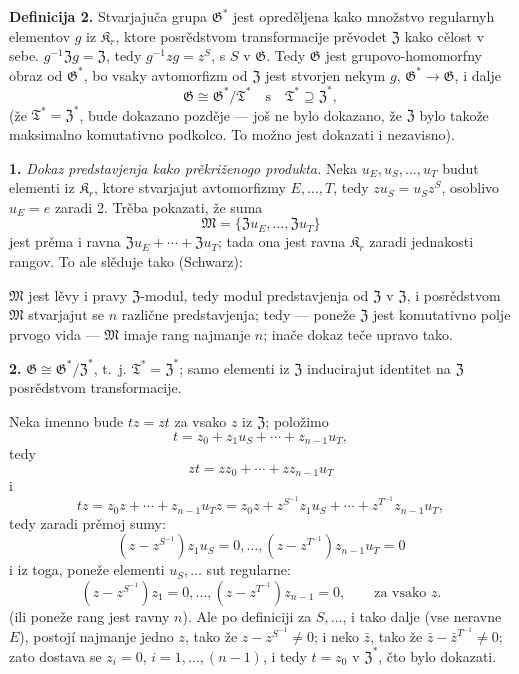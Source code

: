 \documentclass[11pt]{article}
\begin{document}
\noindent\textbf{Definicija 2.} Stvarjajuča grupa \(\mathfrak G^*\) jest opreděljena kako množstvo regularnyh elementov \(g\) iz \(\mathfrak K_r\), ktore posrědstvom transformacije prěvodet \(\mathfrak Z\) kako cělost v sebe. \(g^{-1}\mathfrak Zg=\mathfrak Z\), tedy \(g^{-1}zg=z^S\), s \(S\) v \(\mathfrak G\). Tedy \(\mathfrak G\) jest grupovo-homomorfny obraz od \(\mathfrak G^*\), bo vsaky avtomorfizm od \(\mathfrak Z\) jest stvorjen nekym \(g\), \(\mathfrak G^*\to\mathfrak G\), i dalje
\[
\mathfrak G\cong\mathfrak G^*/\mathfrak T^*
\quad\text{s}\quad
\mathfrak T^*\supseteq\mathfrak Z^*,
\]
(že \(\mathfrak T^*=\mathfrak Z^*\), bude dokazano pozděje --- još ne bylo dokazano, že \(\mathfrak Z\) bylo takože maksimalno komutativno podkolco. To možno jest dokazati i nezavisno).

\noindent\textbf{1.} \emph{Dokaz predstavjenja kako prěkriženogo produkta.} Neka \(u_E,u_S,\ldots,u_T\) budut elementi iz \(\mathfrak K_r\), ktore stvarjajut avtomorfizmy \(E,\ldots,T\), tedy \(zu_S=u_Sz^S\), osoblivo \(u_E=e\) zaradi 2. Trěba pokazati, že suma
\[
\mathfrak M=\{\mathfrak Zu_E,\ldots,\mathfrak Zu_T\}
\]
jest prěma i ravna \(\mathfrak Zu_E+\cdots+\mathfrak Zu_T\); tada ona jest ravna \(\mathfrak K_r\) zaradi jednakosti rangov. To ale slěduje tako (Schwarz):

\(\mathfrak M\) jest lěvy i pravy \(\mathfrak Z\)-modul, tedy modul predstavjenja od \(\mathfrak Z\) v \(\mathfrak Z\), i posrědstvom \(\mathfrak M\) stvarjajut se \(n\) različne predstavjenja; tedy --- poneže \(\mathfrak Z\) jest komutativno polje prvogo vida --- \(\mathfrak M\) imaje rang najmanje \(n\); inače dokaz teče upravo tako.

\noindent\textbf{2.} \(\mathfrak G\cong\mathfrak G^*/\mathfrak Z^*\), t.~j. \(\mathfrak T^*=\mathfrak Z^*\); samo elementi iz \(\mathfrak Z\) inducirajut identitet na \(\mathfrak Z\) posrědstvom transformacije.

Neka imenno bude \(tz=zt\) za vsako \(z\) iz \(\mathfrak Z\); položimo
\[
t=z_0+z_1u_S+\cdots+z_{n-1}u_T,
\]
tedy
\[
zt=zz_0+\cdots+zz_{n-1}u_T
\]
i
\[
tz=z_0z+\cdots+z_{n-1}u_Tz
=z_0z+z^{S^{-1}}z_1u_S+\cdots+z^{T^{-1}}z_{n-1}u_T,
\]
tedy zaradi prěmoj sumy:
\[
(z-z^{S^{-1}})z_1u_S=0,\ldots,
(z-z^{T^{-1}})z_{n-1}u_T=0
\]
i iz toga, poneže elementi \(u_S,\ldots\) sut regularne:
\[
(z-z^{S^{-1}})z_1=0,\ldots,
(z-z^{T^{-1}})z_{n-1}=0,
\qquad\text{za vsako }z.
\]
(ili poneže rang jest ravny \(n\)). Ale po definiciji za \(S,\ldots\), i tako dalje (vse neravne \(E\)), postojí najmanje jedno \(z\), tako že \(z-z^{S^{-1}}\neq0\); i neko \(\bar z\), tako že \(\bar z-\bar z^{T^{-1}}\neq0\); zato dostava se \(z_i=0\), \(i=1,\ldots,(n-1)\), i tedy \(t=z_0\) v \(\mathfrak Z^*\), čto bylo dokazati.
\end{document}

